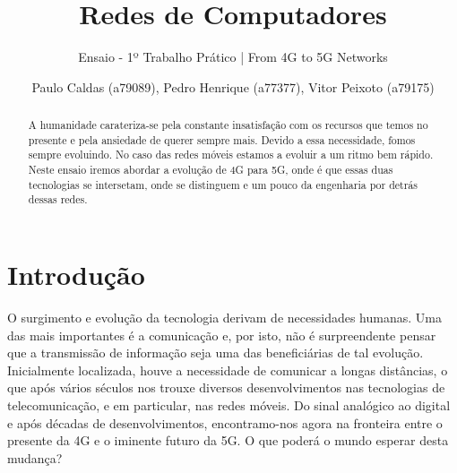\documentclass{llncs}
\begin{document}
\title{Redes de Computadores}
\subtitle{Ensaio - 1º Trabalho Prático | From 4G to 5G Networks}

\author{Paulo Caldas (a79089), Pedro Henrique (a77377), Vitor Peixoto (a79175)}




\maketitle              %

\begin{abstract}

A humanidade carateriza-se pela constante insatisfação com os recursos que temos no presente e pela ansiedade de querer sempre mais. Devido a essa necessidade, fomos sempre evoluindo. No caso das redes móveis estamos a evoluir a um ritmo bem rápido. Neste ensaio iremos abordar a evolução de 4G para 5G, onde é que essas duas tecnologias se intersetam, onde se distinguem e um pouco da engenharia por detrás dessas redes.

\end{abstract}

\section{Introdução}

O surgimento e evolução da tecnologia derivam de necessidades humanas. Uma das mais importantes é a comunicação e, por isto, não é surpreendente pensar que a transmissão de informação seja uma das beneficiárias de tal evolução. Inicialmente localizada, houve a necessidade de comunicar a longas distâncias, o que após vários séculos nos trouxe diversos desenvolvimentos nas tecnologias de telecomunicação, e em particular, nas redes móveis. Do sinal analógico ao digital e após décadas de desenvolvimentos, encontramo-nos agora na fronteira entre o presente da 4G e o iminente futuro da 5G. O que poderá o mundo esperar desta mudança?
\end{document}

